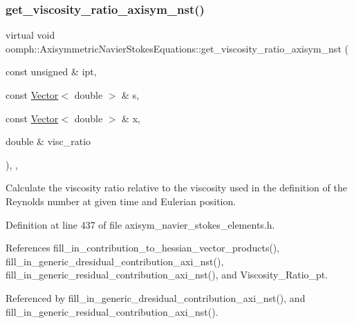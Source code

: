 \subsubsection{\texorpdfstring{get\+\_\+viscosity\+\_\+ratio\+\_\+axisym\+\_\+nst()}{get\_viscosity\_ratio\_axisym\_nst()}}
{\footnotesize\ttfamily virtual void oomph\+::\+Axisymmetric\+Navier\+Stokes\+Equations\+::get\+\_\+viscosity\+\_\+ratio\+\_\+axisym\+\_\+nst (\begin{DoxyParamCaption}\item[{const unsigned \&}]{ipt,  }\item[{const \hyperlink{classoomph_1_1Vector}{Vector}$<$ double $>$ \&}]{s,  }\item[{const \hyperlink{classoomph_1_1Vector}{Vector}$<$ double $>$ \&}]{x,  }\item[{double \&}]{visc\+\_\+ratio }\end{DoxyParamCaption})\hspace{0.3cm}{\ttfamily [inline]}, {\ttfamily [protected]}, {\ttfamily [virtual]}}



Calculate the viscosity ratio relative to the viscosity used in the definition of the Reynolds number at given time and Eulerian position. 



Definition at line 437 of file axisym\+\_\+navier\+\_\+stokes\+\_\+elements.\+h.



References fill\+\_\+in\+\_\+contribution\+\_\+to\+\_\+hessian\+\_\+vector\+\_\+products(), fill\+\_\+in\+\_\+generic\+\_\+dresidual\+\_\+contribution\+\_\+axi\+\_\+nst(), fill\+\_\+in\+\_\+generic\+\_\+residual\+\_\+contribution\+\_\+axi\+\_\+nst(), and Viscosity\+\_\+\+Ratio\+\_\+pt.



Referenced by fill\+\_\+in\+\_\+generic\+\_\+dresidual\+\_\+contribution\+\_\+axi\+\_\+nst(), and fill\+\_\+in\+\_\+generic\+\_\+residual\+\_\+contribution\+\_\+axi\+\_\+nst().

\mbox{\label{classoomph_1_1AxisymmetricNavierStokesEquations_a6b9d0da30e29b199c962ed943317e4f0}} 
